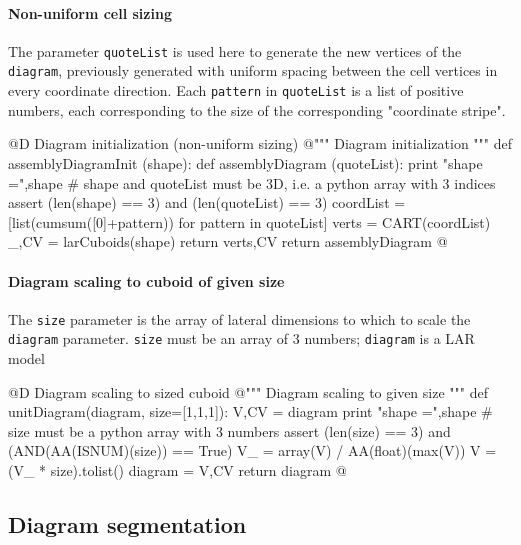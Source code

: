 \documentclass[11pt,oneside]{article}	%
\begin{document}
\paragraph{Non-uniform cell sizing}

The parameter \texttt{quoteList} is used here to generate the new vertices of the \texttt{diagram}, previously generated with uniform spacing between the cell vertices in every coordinate direction.
Each \texttt{pattern} in \texttt{quoteList} is a list of positive numbers, each corresponding to the size of the corresponding "coordinate stripe".

@D Diagram initialization (non-uniform sizing)
@{""" Diagram initialization """
def assemblyDiagramInit (shape):
	def assemblyDiagram (quoteList):
		print "\n shape =",shape
		# shape and quoteList must be 3D, i.e. a python array with 3 indices
		assert (len(shape) == 3) and (len(quoteList) == 3)
		coordList = [list(cumsum([0]+pattern)) for pattern in quoteList]
		verts = CART(coordList)
		_,CV = larCuboids(shape)
		return verts,CV
	return assemblyDiagram
@}


\paragraph{Diagram scaling to cuboid of given size}
The \texttt{size} parameter is the array of lateral dimensions to which to scale the 
\texttt{diagram} parameter. \texttt{size} must be an array of 3 numbers; \texttt{diagram} is
a LAR model

@D Diagram scaling to sized cuboid
@{""" Diagram scaling to given size """
def unitDiagram(diagram, size=[1,1,1]):
	V,CV = diagram
	print "\n shape =",shape
	# size must be a python array with 3 numbers
	assert (len(size) == 3) and (AND(AA(ISNUM)(size)) == True)
	V_ = array(V) / AA(float)(max(V))
	V = (V_ * size).tolist()
	diagram = V,CV
	return diagram
@}




\subsection{Diagram segmentation}
\end{document}
